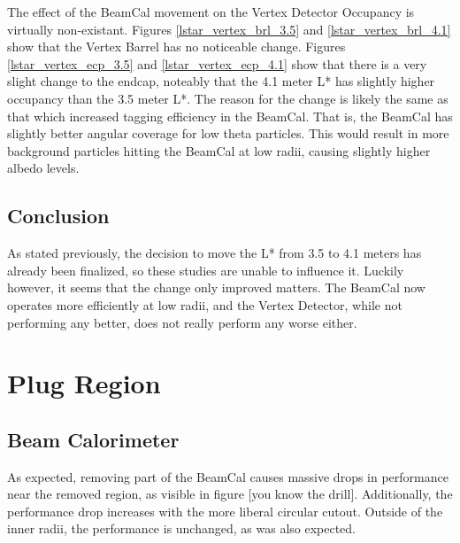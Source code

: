 \documentclass{report}
\begin{document}
                The effect of the BeamCal movement on the Vertex Detector Occupancy is virtually non-existant. Figures \ref{lstar_vertex_brl_3.5} and \ref{lstar_vertex_brl_4.1} show that the Vertex Barrel has no noticeable change. Figures \ref{lstar_vertex_ecp_3.5} and \ref{lstar_vertex_ecp_4.1} show that there is a very slight change to the endcap, noteably that the 4.1 meter L* has slightly higher occupancy than the 3.5 meter L*. The reason for the change is likely the same as that which increased tagging efficiency in the BeamCal. That is, the BeamCal has slightly better angular coverage for low theta particles. This would result in more background particles hitting the BeamCal at low radii, causing slightly higher albedo levels.

            \subsection{Conclusion}
                As stated previously, the decision to move the L* from 3.5 to 4.1 meters has already been finalized, so these studies are unable to influence it. Luckily however, it seems that the change only improved matters. The BeamCal now operates more efficiently at low radii, and the Vertex Detector, while not performing any better, does not really perform any worse either.


        \section{Plug Region}
            \subsection{Beam Calorimeter}
                As expected, removing part of the BeamCal causes massive drops in performance near the removed region, as visible in figure [you know the drill]. Additionally, the performance drop increases with the more liberal circular cutout. Outside of the inner radii, the performance is unchanged, as was also expected.
                
\end{document}
